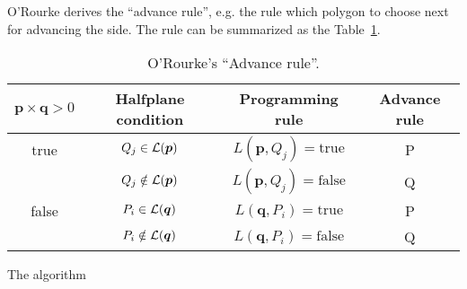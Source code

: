 O'Rourke derives the ``advance rule'', e.g. the rule which polygon to
choose next for advancing the side. The rule can be summarized as the
Table~\ref{tab:arule}.
%
\begin{table}
  \center
  \caption{O'Rourke's ``Advance rule''.}
  \begin{tabular}{c|c|c|c}
    \hline
    $\bm{p}\times\bm{q} > 0$ & Halfplane condition & Programming rule & Advance rule \\
    \hline
    true & $Q_j\in {\cal L}(\bm{p})$     & $L(\bm{p},Q_j)=\text{true}$ & P \\
         & $Q_j\notin {\cal L}(\bm{p})$  & $L(\bm{p},Q_j)=\text{false}$ & Q \\
    \hline
    false & $P_i\in {\cal L}(\bm{q})$    & $L(\bm{q},P_i)=\text{true}$ & P \\
          & $P_i\notin {\cal L}(\bm{q})$ & $L(\bm{q},P_i)=\text{false}$ & Q \\
    \hline
  \end{tabular}
  \label{tab:arule}
\end{table}

The algorithm
